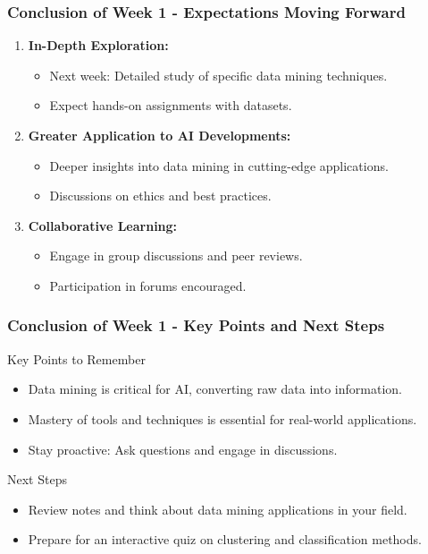 \documentclass[aspectratio=169]{beamer}
\begin{document}
\begin{frame}[fragile]
  \frametitle{Conclusion of Week 1 - Expectations Moving Forward}

  \begin{enumerate}
    \item \textbf{In-Depth Exploration:}
    \begin{itemize}
      \item Next week: Detailed study of specific data mining techniques.
      \item Expect hands-on assignments with datasets.
    \end{itemize}

    \item \textbf{Greater Application to AI Developments:}
    \begin{itemize}
      \item Deeper insights into data mining in cutting-edge applications.
      \item Discussions on ethics and best practices.
    \end{itemize}

    \item \textbf{Collaborative Learning:}
    \begin{itemize}
      \item Engage in group discussions and peer reviews.
      \item Participation in forums encouraged.
    \end{itemize}
  \end{enumerate}
\end{frame}

\begin{frame}[fragile]
  \frametitle{Conclusion of Week 1 - Key Points and Next Steps}

  \begin{block}{Key Points to Remember}
    \begin{itemize}
      \item Data mining is critical for AI, converting raw data into information.
      \item Mastery of tools and techniques is essential for real-world applications.
      \item Stay proactive: Ask questions and engage in discussions.
    \end{itemize}
  \end{block}

  \begin{block}{Next Steps}
    \begin{itemize}
      \item Review notes and think about data mining applications in your field.
      \item Prepare for an interactive quiz on clustering and classification methods.
    \end{itemize}
  \end{block}
\end{frame}
\end{document}
